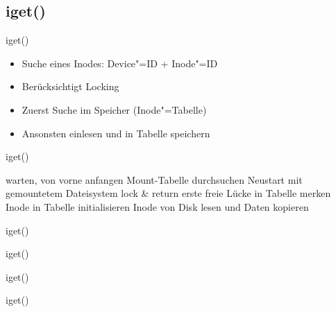 \documentclass{beamer}
\begin{document}


\subsection{iget()}

\begin{frame}{iget()}
    \begin{itemize}
        \item Suche eines Inodes: Device"=ID + Inode"=ID
        \item Berücksichtigt Locking

        \bigskip

        \item Zuerst Suche im Speicher (Inode"=Tabelle)
        \item Ansonsten einlesen und in Tabelle speichern
    \end{itemize}
\end{frame}

\begin{frame}{iget()}
    \begin{algorithmic}[1]
                    \State warten, von vorne anfangen
                \EndIf
                    \State Mount-Tabelle durchsuchen
                    \State Neustart mit gemountetem Dateisystem
                \EndIf
                \State lock \& return
            \EndIf
            \State erste freie Lücke in Tabelle merken
        \EndFor
        \State Inode in Tabelle initialisieren
        \State Inode von Disk lesen und Daten kopieren
    \end{algorithmic}
\end{frame}

\begin{frame}{iget()}
\end{frame}

\begin{frame}{iget()}
\end{frame}

\begin{frame}{iget()}
\end{frame}

\begin{frame}{iget()}
\end{frame}
\end{document}
